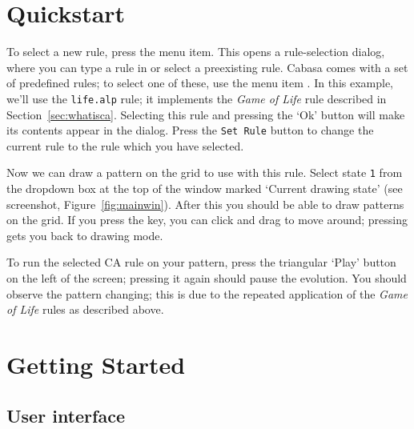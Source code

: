 \documentclass[oneside,a4paper]{memoir}
\begin{document}
\chapter{Quickstart}
\label{chap:qstart}

To select a new rule, press the  menu item.
This opens a rule-selection dialog, where you can type a rule in or select a preexisting rule.
Cabasa comes with a set of predefined rules; to select one of these, use the menu item .
In this example, we'll use the \texttt{life.alp} rule; it implements the \emph{Game of Life} rule described in Section~\ref{sec:whatisca}.
Selecting this rule and pressing the `Ok' button will make its contents appear in the dialog.
Press the \texttt{Set Rule} button to change the current rule to the rule which you have selected.

Now we can draw a pattern on the grid to use with this rule.
Select state \texttt{1} from the dropdown box at the top of the window marked `Current drawing state' (see screenshot, Figure~\ref{fig:mainwin}).
After this you should be able to draw patterns on the grid.
If you press the  key, you can click and drag to move around; pressing  gets you back to drawing mode.

To run the selected CA rule on your pattern, press the triangular `Play' button on the left of the screen;
  pressing it again should pause the evolution.
You should observe the pattern changing;
  this is due to the repeated application of the \emph{Game of Life} rules as described above.

\chapter{Getting Started}
\label{chap:gstart}

\section{User interface}
\label{sec:ui}
\end{document}
